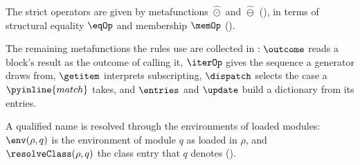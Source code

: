 The strict operators are given by metafunctions $\hat{\odot}$ and $\hat{\ominus}$ (), in
terms of structural equality $\eqOp$ and membership $\memOp$ ().






The remaining metafunctions the rules use are collected in : $\outcome$ reads a
block's result as the outcome of calling it, $\iterOp$ gives the sequence a generator draws from, $\getitem$
interprets subscripting, $\dispatch$ selects the case a $\pyinline{match}$ takes, and $\entries$ and
$\update$ build a dictionary from its entries.



A qualified name is resolved through the environments of loaded modules: $\env(\rho, q)$ is the
environment of module $q$ as loaded in $\rho$, and $\resolveClass(\rho, q)$ the class entry that $q$
denotes ().



